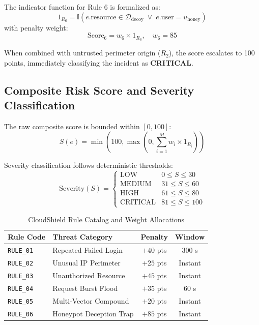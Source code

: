 \documentclass[conference]{IEEEtran}
\begin{document}
The indicator function for Rule 6 is formalized as:
\begin{equation}
    1_{R_6} = \mathbb{I}\left( e.\text{resource} \in \mathcal{D}_{\text{decoy}} \;\lor\; e.\text{user} = u_{\text{honey}} \right)
\end{equation}
with penalty weight:
\begin{equation}
    \text{Score}_6 = w_6 \times 1_{R_6}, \quad w_6 = 85
\end{equation}

When combined with untrusted perimeter origin ($R_2$), the score escalates to 100 points, immediately classifying the incident as \textbf{CRITICAL}.

\subsection{Composite Risk Score and Severity Classification}
The raw composite score is bounded within $[0, 100]$:
\begin{equation}
    S(e) = \min\left(100, \max\left(0, \sum_{i=1}^{M} w_i \times 1_{R_i}\right)\right)
\end{equation}

Severity classification follows deterministic thresholds:
\begin{equation}
    \text{Severity}(S) = 
    \begin{cases} 
      \text{LOW} & 0 \le S \le 30 \\
      \text{MEDIUM} & 31 \le S \le 60 \\
      \text{HIGH} & 61 \le S \le 80 \\
      \text{CRITICAL} & 81 \le S \le 100 
    \end{cases}
\end{equation}

\begin{table}[htbp]
\caption{CloudShield Rule Catalog and Weight Allocations}
\begin{center}
\begin{tabular}{llcc}
\toprule
\textbf{Rule Code} & \textbf{Threat Category} & \textbf{Penalty} & \textbf{Window} \\
\midrule
\texttt{RULE\_01} & Repeated Failed Login & $+40$ pts & $300$ s \\
\texttt{RULE\_02} & Unusual IP Perimeter & $+25$ pts & Instant \\
\texttt{RULE\_03} & Unauthorized Resource & $+45$ pts & Instant \\
\texttt{RULE\_04} & Request Burst Flood & $+35$ pts & $60$ s \\
\texttt{RULE\_05} & Multi-Vector Compound & $+20$ pts & Instant \\
\texttt{RULE\_06} & Honeypot Deception Trap & $+85$ pts & Instant \\
\bottomrule
\end{tabular}
\end{center}
\end{table}
\end{document}
